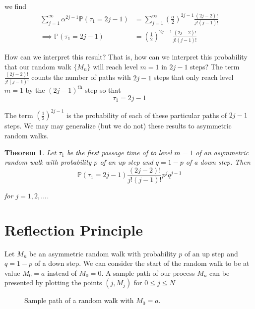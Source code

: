 \documentclass[12pt]{article}
\newtheorem{theorem}{Theorem}
\newlength\tindent
\renewcommand{\indent}{\hspace*{\tindent}}
\renewcommand{\P}{\mathbb P}
\begin{document}
we find
\begin{align*}
	\sum^\infty_{j = 1} \alpha^{2j - 1} \P(\tau_1 = 2j - 1) &= \sum^\infty_{j = 1} \left( \frac{\alpha}{2} \right)^{2j - 1} \frac{ (2j - 2)! }{ j!(j - 1)! }  \\
	\implies \P(\tau_1 = 2j - 1) &= \left( \frac{1}{2} \right)^{2j - 1} \frac{ (2j - 2)! }{ j!(j - 1)! }
\end{align*}

\indent How can we interpret this result? That is, how can we interpret this probability that our random walk $\{M_n\}$ will reach level $m = 1$ in $2j - 1$ steps? The term $\frac{ (2j - 2)! }{ j!(j - 1)! }$ counts the number of paths with $2j - 1$ steps that only reach level $m = 1$ by the $(2j - 1)^\text{th}$ step so that
\begin{equation*}
	\tau_1 = 2j - 1
\end{equation*}

\indent The term $\left( \frac{1}{2} \right)^{2j - 1}$ is the probability of each of these particular paths of $2j - 1$ steps. We may may generalize (but we do not) these results to asymmetric random walks.

\begin{theorem} Let $\tau_1$ be the first passage time of to level $m = 1$ of an asymmetric random walk with probability $p$ of an up step and $q = 1 - p$ of a down step. Then
\begin{equation*}
	\P(\tau_1 = 2j - 1) \frac{ (2j - 2)! }{ j!(j - 1)! } p^jq^{j - 1}
\end{equation*}

for $j = 1,2,...$.
\end{theorem}

\section{Reflection Principle}

\indent Let $M_n$ be an asymmetric random walk with probability $p$ of an up step and $q = 1 - p$ of a down step. We can consider the start of the random walk to be at value $M_0 = a$ instead of $M_0 = 0$. A sample path of our process $M_n$ can be presented by plotting the points $(j, M_j)$ for $0 \leq j \leq N$
\begin{figure}[H]
\centering
{}
\caption{Sample path of a random walk with $M_0 = a$.}
\end{figure}
\end{document}
